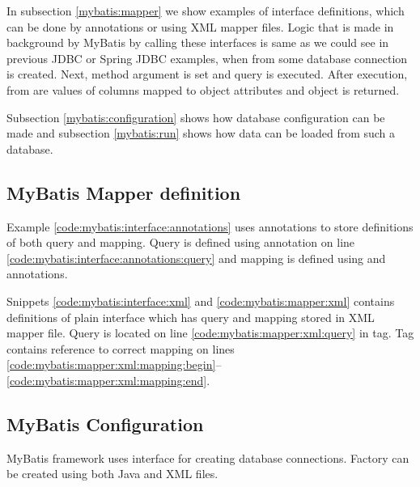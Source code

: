 In subsection \ref{mybatis:mapper} we show examples of  interface definitions,
which can be done by annotations or using XML mapper files.
Logic that is made in background by MyBatis by calling these interfaces
is same as we could see in previous JDBC or Spring JDBC examples,
when from some database connection  is created.
Next, method argument  is set and query is executed.
After execution, from  are values of columns
mapped to object attributes and object is returned.

Subsection \ref{mybatis:configuration} shows how database
configuration can be made and subsection \ref{mybatis:run}
shows how data can be loaded from such a database.



\subsection{MyBatis Mapper definition \label{mybatis:mapper}}


Example \ref{code:mybatis:interface:annotations} uses annotations to store definitions of both query and mapping.
Query is defined using  annotation on line \ref{code:mybatis:interface:annotations:query}
and mapping is defined using  and  annotations.


Snippets \ref{code:mybatis:interface:xml} and \ref{code:mybatis:mapper:xml} contains definitions
of plain interface which has query and mapping stored in XML mapper file.
Query is located on line \ref{code:mybatis:mapper:xml:query} in  tag.
Tag contains reference to correct  mapping on lines
\ref{code:mybatis:mapper:xml:mapping:begin}--\ref{code:mybatis:mapper:xml:mapping:end}.



\subsection{MyBatis Configuration \label{mybatis:configuration}}

MyBatis framework uses interface  for creating database connections.
Factory can be created using both Java and XML files.


